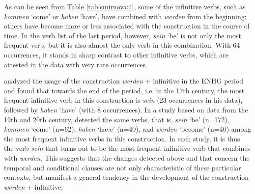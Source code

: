 \documentclass[output=paper,colorlinks,citecolor=brown]{langscibook}
\begin{document}
\par As can be seen from Table \ref{tab:smirnova:4}, some of the infinitive verbs, such as \emph{kommen} `come' or \emph{haben} `have', have combined with \emph{werden} from the beginning; others have become more or less associated with the construction in the course of time. In the verb list of the last period, however, \emph{sein} `be' is not only the most frequent verb, but it is also almost the only verb in this combination. With 64 occurrences, it stands in sharp contrast to other infinitive verbs, which are attested in the data with very rare occurrences. 
\par \citet[385]{Hartmann2021} analyzed the usage of the construction \emph{werden} + infinitive in the ENHG period and found that towards the end of the period, i.e. in the 17th century, the most frequent infinitive verb in this construction is \emph{sein} (23 occurrences in his data), followed by \emph{haben} `have' (with 8 occurrences). In a study based on data from the 19th and 20th century, \citet[148]{Hilpert2008} detected the same verbs, that is, \emph{sein} `be' (n=172), \emph{kommen} `come' (n=62), \emph{haben} `have' (n=40), and \emph{werden} `become' (n=40) among the most frequent infinitive verbs in this construction. In each study, it is thus the verb \emph{sein} that turns out to be the most frequent infinitive verb that combines with \emph{werden}. This suggests that the changes detected above and that concern the temporal and conditional clauses are not only characteristic of these particular contexts, but manifest a general tendency in the development of the construction \emph{werden} + infinitive. 
\end{document}
